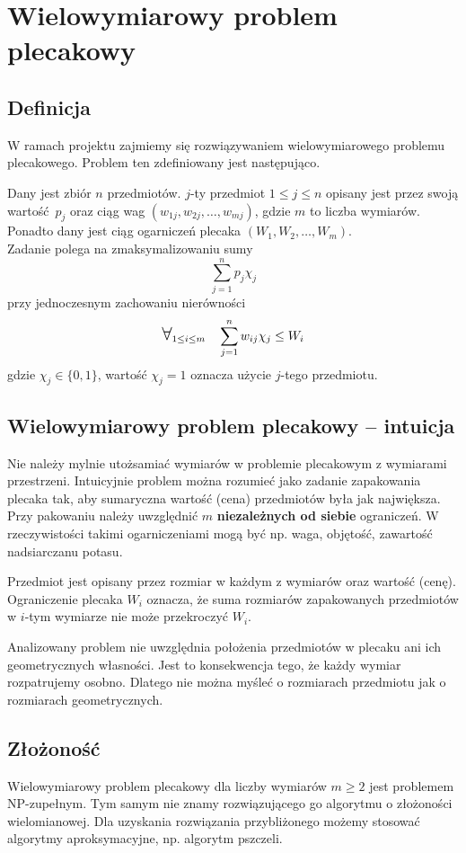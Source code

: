\documentclass[a4paper,12pt,notitlepage]{mwrep}
\begin{document}
\section{Wielowymiarowy problem plecakowy}
\subsection{Definicja}
W ramach projektu zajmiemy się rozwiązywaniem wielowymiarowego problemu plecakowego.
Problem ten zdefiniowany jest następująco.

Dany jest zbiór $n$ przedmiotów. $j$-ty przedmiot $1 \le j \le n$
opisany jest przez swoją wartość~$p_j$ oraz ciąg wag
$(w_{1j}, w_{2j}, \dots, w_{mj})$, gdzie $m$ to liczba wymiarów.\\
Ponadto dany jest ciąg ogarniczeń plecaka $(W_1, W_2, \dots, W_m)$.\\
Zadanie polega na zmaksymalizowaniu sumy
$$ \sum_{j=1}^n p_j\chi_j$$
przy jednoczesnym zachowaniu nierówności
$$\bigforall_{1 \le i \le m}\quad\sum_{j=1}^n w_{ij}\chi_j \le W_i$$
gdzie $\chi_j \in \{0, 1\}$, wartość $\chi_j=1$
oznacza użycie $j$-tego przedmiotu.


\subsection{Wielowymiarowy problem plecakowy -- intuicja}
Nie należy mylnie utożsamiać wymiarów w problemie plecakowym z 
wymiarami przestrzeni. Intuicyjnie problem można rozumieć jako zadanie
zapakowania plecaka tak, aby sumaryczna wartość (cena)
przedmiotów była jak największa.
Przy pakowaniu należy uwzględnić $m$ \textbf{niezależnych od siebie}
ograniczeń. W rzeczywistości takimi ogarniczeniami mogą być np. waga,
objętość, zawartość nadsiarczanu potasu.

Przedmiot jest opisany przez
rozmiar w każdym z wymiarów oraz wartość (cenę). Ograniczenie plecaka
$W_i$ oznacza, że suma rozmiarów zapakowanych przedmiotów w $i$-tym
wymiarze nie może przekroczyć $W_i$.

Analizowany problem nie uwzględnia położenia przedmiotów w plecaku
ani ich geometrycznych własności. Jest to konsekwencja tego, że każdy
wymiar rozpatrujemy osobno. Dlatego nie można myśleć o rozmiarach
przedmiotu jak o rozmiarach geometrycznych.

\subsection{Złożoność}
Wielowymiarowy problem plecakowy dla liczby wymiarów $m \ge 2$ jest
problemem NP-zupełnym. Tym samym nie znamy rozwiązującego go
algorytmu o złożoności wielomianowej. Dla uzyskania rozwiązania
przybliżonego możemy stosować algorytmy aproksymacyjne, np. algorytm
pszczeli.
\end{document}
